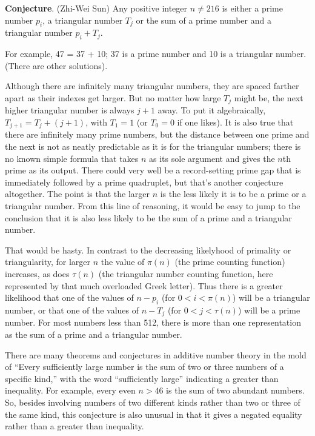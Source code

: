 \documentclass[12pt]{article}
\begin{document}
{\bf Conjecture}. (Zhi-Wei Sun) Any positive integer $n \neq 216$ is either a prime number $p_i$, a triangular number $T_j$ or the sum of a prime number and a triangular number $p_i + T_j$.

For example, 47 = 37 + 10; 37 is a prime number and 10 is a triangular number. (There are other solutions).

Although there are infinitely many triangular numbers, they are spaced farther apart as their indexes get larger. But no matter how large $T_j$ might be, the next higher triangular number is always $j + 1$ away. To put it algebraically, $T_{j + 1} = T_j + (j + 1)$, with $T_1 = 1$ (or $T_0 = 0$ if one likes). It is also true that there are infinitely many prime numbers, but the distance between one prime and the next is not as neatly predictable as it is for the triangular numbers; there is no known simple formula that takes $n$ as its sole argument and gives the $n$th prime as its output. There could very well be a record-setting prime gap that is immediately followed by a prime quadruplet, but that's another conjecture altogether. The point is that the larger $n$ is the less likely it is to be a prime or a triangular number. From this line of reasoning, it would be easy to jump to the conclusion that it is also less likely to be the sum of a prime and a triangular number.

That would be hasty. In contrast to the decreasing likelyhood of primality or triangularity, for larger $n$ the value of $\pi(n)$ (the prime counting function) increases, as does $\tau(n)$ (the triangular number counting function, here represented by that much overloaded Greek letter). Thus there is a greater likelihood that one of the values of $n - p_i$ (for $0 < i < \pi(n)$) will be a triangular number, or that one of the values of $n - T_j$ (for $0 < j < \tau(n)$) will be a prime number. For most numbers less than 512, there is more than one representation as the sum of a prime and a triangular number.

There are many theorems and conjectures in additive number theory in the mold of ``Every sufficiently large number is the sum of two or three numbers of a specific kind,'' with the word ``sufficiently large'' indicating a greater than inequality. For example, every even $n > 46$ is the sum of two abundant numbers. So, besides involving numbers of two different kinds rather than two or three of the same kind, this conjecture is also unusual in that it gives a negated equality rather than a greater than inequality.
\end{document}

